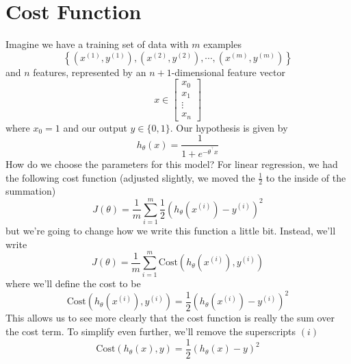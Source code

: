 \section{Cost Function}
Imagine we have a training set of data with $m$ examples
$$
\left\{ \left(x^{\left(1\right)}, y^{\left(1\right)}\right), \left(x^{\left(2\right)}, y^{\left(2\right)}\right), \cdots, \left(x^{\left(m\right)}, y^{\left(m\right)}\right) \right\}
$$
and $n$ features, represented by an $n+1$-dimensional feature vector
$$
x \in \left[\begin{array}{c} x_0 \\ x_1 \\ \vdots \\ x_n \end{array}\right]
$$
where $x_0 = 1$ and our output $y \in \{0, 1\}$. Our hypothesis is given by
\begin{equation}
h_\theta\left(x\right) = \frac{1}{1 + e^{-\theta^{{}^\intercal}x}}
\end{equation}
How do we choose the parameters for this model? For linear regression, we had the following cost function (adjusted slightly, we moved the $\tfrac{1}{2}$ to the inside of the summation)
\begin{equation}
J\left(\theta\right) = \frac{1}{m} \sum_{i=1}^m \frac{1}{2} \left(		h_\theta\left(x^{\left(i\right)}\right) - y^{\left(i\right)}	\right)^2
\end{equation}
but we're going to change how we write this function a little bit. Instead, we'll write
\begin{equation}
J\left(\theta\right) = \frac{1}{m} \sum_{i=1}^m \text{Cost}\left(	h_\theta\left(x^{\left(i\right)}\right), y^{\left(i\right)}\right)
\end{equation}
where we'll define the cost to be
\begin{equation}
\text{Cost}\left(	h_\theta\left(x^{\left(i\right)}\right), y^{\left(i\right)}\right) = \frac{1}{2} \left(h_\theta\left(x^{\left(i\right)}\right) - y^{\left(i\right)}	\right)^2
\end{equation}
This allows us to see more clearly that the cost function is really the sum over the cost term. To simplify even further, we'll remove the superscripts $\left(i\right)$
\begin{equation}
\text{Cost}\left(h_\theta\left(x\right), y\right) = \frac{1}{2} \left(	h_\theta\left(x\right) - y \right)^2
\end{equation}


